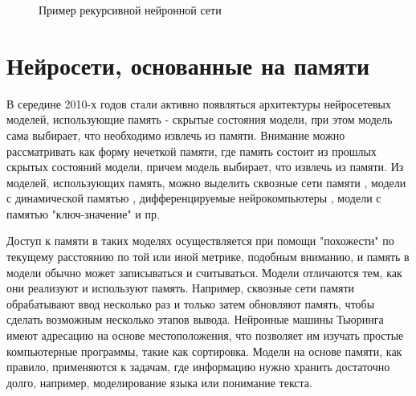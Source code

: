 \begin{figure}[ht]
  \caption{Пример рекурсивной нейронной сети}\label{fig:Neuro5-RNN}
\end{figure}


\section{Нейросети, основанные на памяти}
В середине 2010-х годов стали активно появляться архитектуры нейросетевых моделей, использующие память - скрытые состояния модели, при этом модель сама выбирает, что необходимо извлечь из памяти. 
     Внимание можно рассматривать как форму нечеткой памяти, где память состоит из прошлых скрытых состояний модели, причем модель выбирает, что извлечь из памяти.  Из моделей, использующих память, можно выделить сквозные сети памяти \cite{sukhbaatar_2015}, модели с динамической памятью \cite{kumar_2016}, дифференцируемые нейрокомпьютеры \cite{graves_2016}, модели с памятью "ключ-значение" \cite{miller_2016} и пр.
 
     Доступ к памяти в таких моделях осуществляется при помощи "похожести" по текущему расстоянию по той или иной метрике, подобным вниманию, и память в модели обычно может записываться и считываться.  Модели отличаются тем, как они реализуют и используют память. Например, сквозные сети памяти обрабатывают ввод несколько раз и только затем обновляют память, чтобы сделать возможным несколько этапов вывода.  Нейронные машины Тьюринга имеют адресацию на основе местоположения, что позволяет им изучать простые компьютерные программы, такие как сортировка.  Модели на основе памяти, как правило, применяются к задачам, где информацию нужно хранить достаточно долго, например, моделирование языка или понимание текста.  

